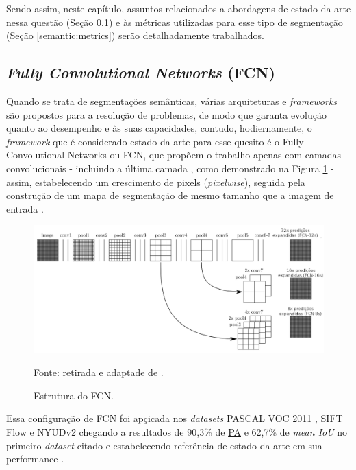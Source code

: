 Sendo assim, neste capítulo, assuntos relacionados a abordagens de estado-da-arte nessa questão (Seção \ref{semantic:FCN}) e às métricas utilizadas para esse tipo de segmentação (Seção \ref{semantic:metrics}) serão detalhadamente trabalhados.


\subsection{\textit{Fully Convolutional Networks} (FCN)}
\label{semantic:FCN}

Quando se trata de segmentações semânticas, várias arquiteturas e \textit{frameworks} são propostos para a resolução de problemas, de modo que garanta evolução quanto ao desempenho e às suas capacidades, contudo, hodiernamente, o \textit{framework} que é considerado estado-da-arte para esse quesito é o Fully Convolutional Networks \cite{Shelhamer2016} ou FCN, que propõem o trabalho apenas com camadas convolucionais - incluindo a última camada \cite{Hesamian2019}, como demonstrado na Figura \ref{semantic:fig:5} - assim, estabelecendo um crescimento de pixels (\textit{pixelwise}), seguida pela construção de um mapa de segmentação de mesmo tamanho que a imagem de entrada \cite{Minaee2021, Zhang2018, Hesamian2019}.

\begin{figure}[H]
    \centering
    \caption{Estrutura do FCN.}
    \includegraphics[width=1\linewidth]{recursos/imagens/semantic/fcn_arch.png}
    \label{semantic:fig:5}

    \vspace*{1 cm}
    Fonte: retirada e adaptade de \cite{Shelhamer2016}.
\end{figure}

Essa configuração de FCN foi apçicada nos \textit{datasets} PASCAL VOC 2011 \cite{everingham2010pascal}, SIFT Flow \cite{Liu2011} e NYUDv2 \cite{Silberman:ECCV12} chegando a resultados de 90,3\% de \hyperref[semantic:pa]{PA} e 62,7\% de \textit{mean IoU} no primeiro \textit{dataset} citado \cite{Ghosh2019} e estabelecendo referência de estado-da-arte em sua performance \cite{Minaee2021}.


